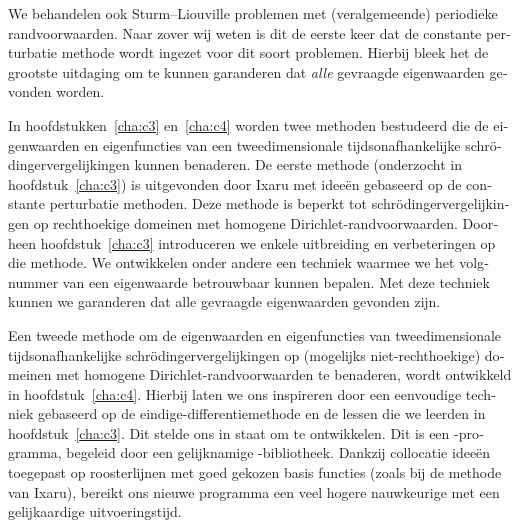 \begin{otherlanguage}{dutch}
We behandelen ook Sturm--Liouville problemen met (veralgemeende) periodieke randvoorwaarden. Naar zover wij weten is dit de eerste keer dat de constante perturbatie methode wordt ingezet voor dit soort problemen. Hierbij bleek het de grootste uitdaging om te kunnen garanderen dat \emph{alle} gevraagde eigenwaarden gevonden worden.

In hoofdstukken~\ref{cha:c3} en~\ref{cha:c4} worden twee methoden bestudeerd die de eigenwaarden en eigenfuncties van een tweedimensionale tijdsonafhankelijke schrödinger\-vergelijkingen kunnen benaderen. De eerste methode (onderzocht in hoofdstuk~\ref{cha:c3}) is uitgevonden door Ixaru met ideeën gebaseerd op de constante perturbatie methoden. Deze methode is beperkt tot schrödingervergelijkingen op rechthoekige domeinen met homogene Dirichlet-randvoorwaarden. Doorheen hoofdstuk~\ref{cha:c3} introduceren we enkele uitbreiding en verbeteringen op die methode. We ontwikkelen onder andere een techniek waarmee we het volgnummer van een eigenwaarde betrouwbaar kunnen bepalen. Met deze techniek kunnen we garanderen dat alle gevraagde eigenwaarden gevonden zijn.

Een tweede methode om de eigenwaarden en eigenfuncties van tweedimensionale tijdsonafhankelijke schrödingervergelijkingen op (mogelijks niet-rechthoekige) domeinen met homogene Dirichlet-randvoorwaarden te benaderen, wordt ontwikkeld in hoofdstuk~\ref{cha:c4}. Hierbij laten we ons inspireren door een eenvoudige techniek gebaseerd op de eindige-differentiemethode en de lessen die we leerden in hoofdstuk~\ref{cha:c3}. Dit stelde ons in staat om \strands{} te ontwikkelen. Dit is een \cpp{}-programma, begeleid door een gelijknamige \lpython{}-bibliotheek. Dankzij collocatie ideeën toegepast op roosterlijnen met goed gekozen basis functies (zoals bij de methode van Ixaru), bereikt ons nieuwe programma een veel hogere nauwkeurige met een gelijkaardige uitvoeringstijd. 

\end{otherlanguage}

\stopchapter
